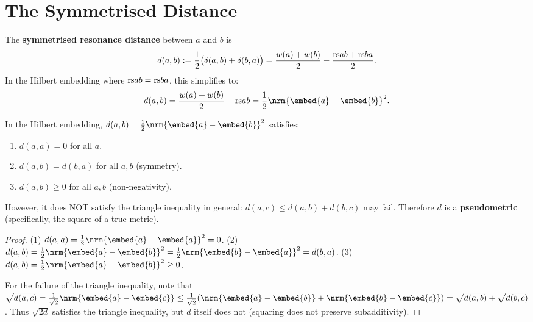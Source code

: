 \section{The Symmetrised Distance}

\begin{definition}
\label{def:sym-distance}
The \textbf{symmetrised resonance distance} between $a$ and $b$ is
\[
  d(a, b) := \frac{1}{2}\bigl(\delta(a, b) + \delta(b, a)\bigr)
  = \frac{w(a) + w(b)}{2} - \frac{\mathrm{rs}{a}{b} + \mathrm{rs}{b}{a}}{2}.
\]
In the Hilbert embedding where $\mathrm{rs}{a}{b} = \mathrm{rs}{b}{a}$, this simplifies to:
\[
  d(a, b) = \frac{w(a) + w(b)}{2} - \rs{a}{b}
  = \frac{1}{2}\nrm{\embed{a} - \embed{b}}^2.
\]
\end{definition}

\begin{theorem}
\label{thm:sym-pseudometric}
In the Hilbert embedding, $d(a,b) = \frac{1}{2}\nrm{\embed{a} - \embed{b}}^2$
satisfies:
\begin{enumerate}
\item $d(a, a) = 0$ for all $a$.
\item $d(a, b) = d(b, a)$ for all $a, b$ (symmetry).
\item $d(a, b) \geq 0$ for all $a, b$ (non-negativity).
\end{enumerate}
However, it does NOT satisfy the triangle inequality in general:
$d(a, c) \leq d(a, b) + d(b, c)$ may fail.  Therefore $d$ is a
\textbf{pseudometric} (specifically, the square of a true metric).
\end{theorem}

\begin{proof}
(1) $d(a,a) = \frac{1}{2}\nrm{\embed{a} - \embed{a}}^2 = 0$.
(2) $d(a,b) = \frac{1}{2}\nrm{\embed{a} - \embed{b}}^2
   = \frac{1}{2}\nrm{\embed{b} - \embed{a}}^2 = d(b,a)$.
(3) $d(a,b) = \frac{1}{2}\nrm{\embed{a} - \embed{b}}^2 \geq 0$.

For the failure of the triangle inequality, note that
$\sqrt{d(a,c)} = \frac{1}{\sqrt{2}}\nrm{\embed{a} - \embed{c}}
\leq \frac{1}{\sqrt{2}}(\nrm{\embed{a} - \embed{b}} + \nrm{\embed{b} - \embed{c}})
= \sqrt{d(a,b)} + \sqrt{d(b,c)}$.
Thus $\sqrt{2d}$ satisfies the triangle inequality, but $d$ itself does not
(squaring does not preserve subadditivity).
\end{proof}

